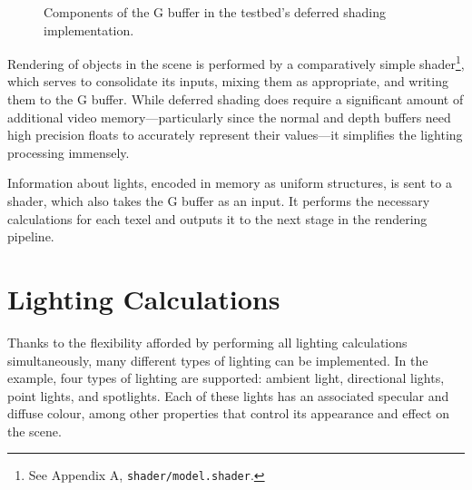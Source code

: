 \documentclass[11pt, oneside]{report}
\begin{document}
\begin{figure}[!htbp]
  \centering
  \hfill
  \hfill
  \caption{Components of the G buffer in the testbed's deferred shading implementation.}
\end{figure}

Rendering of objects in the scene is performed by a comparatively simple \gls{shader}\footnote{See Appendix A, \texttt{shader/model.shader}.}, which serves to consolidate its inputs, mixing them as appropriate, and writing them to the G buffer. While deferred shading does require a significant amount of additional video memory---particularly since the normal and depth buffers need high precision \glspl{float} to accurately represent their values---it simplifies the lighting processing immensely.

Information about lights, encoded in memory as uniform structures, is sent to a shader, which also takes the G buffer as an input. It performs the necessary calculations for each \gls{texel} and outputs it to the next stage in the rendering pipeline.

\section{Lighting Calculations}
Thanks to the flexibility afforded by performing all lighting calculations simultaneously, many different types of lighting can be implemented. In the example, four types of lighting are supported: ambient light, directional lights, point lights, and spotlights. Each of these lights has an associated \gls{specular} and \gls{diffuse} colour, among other properties that control its appearance and effect on the scene.
\end{document}
